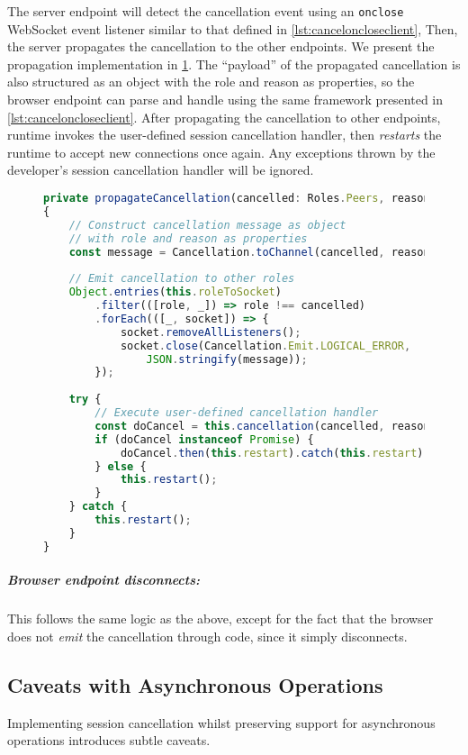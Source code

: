 The server endpoint will detect the cancellation event
using an \texttt{onclose} WebSocket event listener
similar to that defined in \cref{lst:canceloncloseclient},
Then, the server propagates the cancellation
to the other endpoints.
We present the propagation implementation
in \cref{lst:cancelpropagate}.
The ``payload'' of the propagated cancellation is also structured
as an object with the role and reason as properties,
so the browser endpoint can parse and handle using
the same framework presented in \cref{lst:canceloncloseclient}.
After propagating the cancellation to other endpoints,
runtime invokes the user-defined session cancellation
handler, then \textit{restarts} the runtime to accept
new connections once again. 
Any exceptions thrown by the developer's session cancellation
handler will be ignored.

\begin{figure}[!h]
\begin{lstlisting}[language=javascript,tabsize=2]
private propagateCancellation(cancelled: Roles.Peers, reason?: any)
{
	// Construct cancellation message as object
	// with role and reason as properties
	const message = Cancellation.toChannel(cancelled, reason);
	
	// Emit cancellation to other roles
	Object.entries(this.roleToSocket)
		.filter(([role, _]) => role !== cancelled)
		.forEach(([_, socket]) => {
			socket.removeAllListeners();
			socket.close(Cancellation.Emit.LOGICAL_ERROR,
				JSON.stringify(message));
		});
	
	try {
		// Execute user-defined cancellation handler
		const doCancel = this.cancellation(cancelled, reason);
		if (doCancel instanceof Promise) {
			doCancel.then(this.restart).catch(this.restart);		
		} else {
			this.restart();
		}
	} catch {
		this.restart();
	}
}
\end{lstlisting}
\label{lst:cancelpropagate}
\end{figure}

\subparagraph{Browser endpoint disconnects:}
This follows the same logic as the above,
except for the fact that the browser does not
\textit{emit} the cancellation through code, since
it simply disconnects.

\subsection{Caveats with Asynchronous Operations}
Implementing session cancellation whilst
preserving support for asynchronous operations introduces
subtle caveats. 

